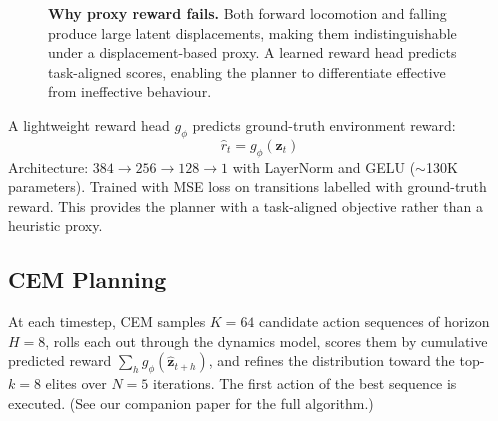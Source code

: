 \documentclass{article}
\begin{document}
\begin{figure}[H]
\caption{\textbf{Why proxy reward fails.} Both forward locomotion and falling produce large latent displacements, making them indistinguishable under a displacement-based proxy. A learned reward head predicts task-aligned scores, enabling the planner to differentiate effective from ineffective behaviour.}
\label{fig:proxy_vs_learned}
\end{figure}

\noindent A lightweight reward head $g_\phi$ predicts ground-truth environment reward:
\begin{equation}
    \hat{r}_t = g_\phi(\mathbf{z}_t)
\end{equation}
Architecture: $384 \rightarrow 256 \rightarrow 128 \rightarrow 1$ with LayerNorm and GELU ($\sim$130K parameters). Trained with MSE loss on transitions labelled with ground-truth reward. This provides the planner with a task-aligned objective rather than a heuristic proxy.

\subsection{CEM Planning}

At each timestep, CEM samples $K{=}64$ candidate action sequences of horizon $H{=}8$, rolls each out through the dynamics model, scores them by cumulative predicted reward $\sum_h g_\phi(\hat{\mathbf{z}}_{t+h})$, and refines the distribution toward the top-$k{=}8$ elites over $N{=}5$ iterations. The first action of the best sequence is executed. (See our companion paper for the full algorithm.)
\end{document}

